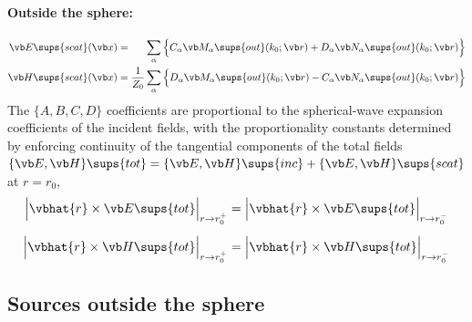 \documentclass[letterpaper]{article}
\begin{document}
\paragraph{Outside the sphere:} 
\begin{subequations}
\begin{align}
 \vb E\sups{scat}(\vb x)
 &=\hphantom{\frac{1}{Z_0}}  \sum_\alpha 
      \Big\{ C_\alpha \vb M_\alpha\sups{out}(k_0; \vb r)
            +D_\alpha \vb N_\alpha\sups{out}(k_0; \vb r)
      \Big\} 
\\
 \vb H\sups{scat}(\vb x)
 &=  \frac{1}{Z_0} \sum_\alpha 
     \Big\{ D_\alpha \vb M_\alpha\sups{out}(k_0; \vb r)
           -C_\alpha \vb N_\alpha\sups{out}(k_0; \vb r)
     \Big\} 
\end{align}
\label{EHScatOutside}%
\end{subequations}
The $\{A, B, C, D\}$ coefficients are proportional to the 
spherical-wave expansion coefficients of the incident fields,
with the proportionality constants determined by enforcing
continuity of the tangential components of the total 
fields $\{\vb E, \vb H\}\sups{tot}=
\{\vb E, \vb H\}\sups{inc}+
\{\vb E, \vb H\}\sups{scat}$
at $r=r_0$,
\begin{subequations}
\begin{align}
 \Big| \vbhat{r} \times \vb E\sups{tot} \Big|_{r\to r_0^+}
&=
 \Big| \vbhat{r} \times \vb E\sups{tot} \Big|_{r\to r_0^-}
\\[5pt]
 \Big| \vbhat{r} \times \vb H\sups{tot} \Big|_{r\to r_0^+}
&=
 \Big| \vbhat{r} \times \vb H\sups{tot} \Big|_{r\to r_0^-}
\end{align}
\label{EHMatching}%
\end{subequations}

\subsection{Sources outside the sphere}
\label{SourcesOutsideSection}
\end{document}
